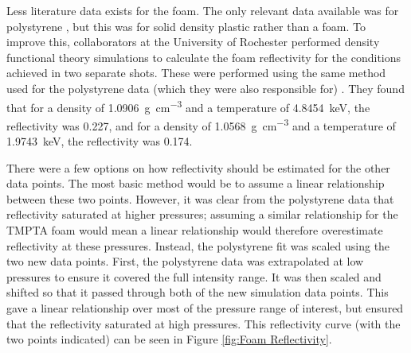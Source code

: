 Less literature data exists for the foam. The only relevant data available was for polystyrene \cite{Hu2014}, but this was for solid density plastic rather than a foam. To improve this, collaborators at the University of Rochester performed density functional theory simulations to calculate the foam reflectivity for the conditions achieved in two separate shots. These were performed using the same method used for the polystyrene data (which they were also responsible for) \cite{Hu2014, Hu2017}. They found that for a density of 1.0906~\unit{\gram\per\centi\meter\cubed} and a temperature of 4.8454~\unit{\kilo\electronvolt}, the reflectivity was 0.227, and for a density of 1.0568~\unit{\gram\per\centi\meter\cubed} and a temperature of 1.9743~\unit{\kilo\electronvolt}, the reflectivity was 0.174. 

There were a few options on how reflectivity should be estimated for the other data points. The most basic method would be to assume a linear relationship between these two points. However, it was clear from the polystyrene data that reflectivity saturated at higher pressures; assuming a similar relationship for the TMPTA foam would mean a linear relationship would therefore overestimate reflectivity at these pressures. Instead, the polystyrene fit was scaled using the two new data points. First, the polystyrene data was extrapolated at low pressures to ensure it covered the full intensity range. It was then scaled and shifted so that it passed through both of the new simulation data points. This gave a linear relationship over most of the pressure range of interest, but ensured that the reflectivity saturated at high pressures. This reflectivity curve (with the two points indicated) can be seen in Figure \ref{fig:Foam Reflectivity}.

